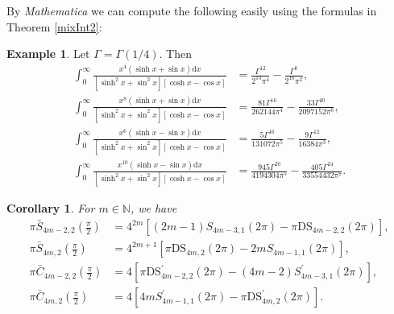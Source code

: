 \documentclass[11pt]{article}
\theoremstyle{plain}
\newtheorem{cor}[thm]{Corollary}
\theoremstyle{definition}
\newtheorem{exa}[thm]{Example}
\begin{document}
By \emph{Mathematica} we can compute the following easily using the formulas in Theorem \ref{mixInt2}:
\begin{exa}\label{ExampleS}
		Let $\Gamma=\Gamma(1/4)$. Then
		\begin{align}
\int_0^{\infty}{\frac{x^4\left( \sinh x+\sin x \right) \mathrm{d}x}{\left[ \sinh ^2x+\sin ^2x \right] \left[ \cosh x-\cos x \right]}}&=\frac{\Gamma ^{12}}{2^{13}\pi ^4}-\frac{\Gamma ^8}{2^{10}\pi ^2},
	\nonumber\\
\int_0^{\infty}{\frac{x^8\left( \sinh x+\sin x \right) \mathrm{d}x}{\left[ \sinh ^2x+\sin ^2x \right] \left[ \cosh x-\cos x \right]}}&=\frac{81\Gamma ^{16}}{262144\pi ^4}-\frac{33\Gamma ^{20}}{2097152\pi ^6},
	\nonumber\\
\int_0^{\infty}{\frac{x^6\left( \sinh x-\sin x \right) \mathrm{d}x}{\left[ \sinh ^2x+\sin ^2x \right] \left[ \cosh x-\cos x \right]}}&=\frac{5\Gamma ^{16}}{131072\pi ^5}-\frac{9\Gamma ^{12}}{16384\pi ^3},
	\nonumber\\
\int_0^{\infty}{\frac{x^{10}\left( \sinh x-\sin x \right) \mathrm{d}x}{\left[ \sinh ^2x+\sin ^2x \right] \left[ \cosh x-\cos x \right]}}&=\frac{945\Gamma ^{20}}{4194304\pi ^5}-\frac{405\Gamma ^{24}}{33554432\pi ^7}.	\nonumber
	\end{align}
\end{exa}
\begin{cor}
	For $m\in \mathbb{N}$, we have
	\begin{align}
				\pi \bar{S}_{4m-2,2}\left( \frac{\pi}{2} \right) &=4^{2m}\left[ \left( 2m-1 \right) S_{4m-3,1}\left( 2\pi \right) -\pi \mathrm{DS}_{4m-2,2}\left( 2\pi \right) \right] ,
		\\
		\pi \bar{S}_{4m,2}\left( \frac{\pi}{2} \right) &=4^{2m+1}\left[ \pi \mathrm{DS}_{4m,2}\left( 2\pi \right) -2mS_{4m-1,1}\left( 2\pi \right) \right] ,
		\\
		\pi \bar{C}_{4m-2,2}\left( \frac{\pi}{2} \right) &=4\left[ \pi \mathrm{DS}_{4m-2,2}^{\prime}\left( 2\pi \right) -\left( 4m-2 \right) S_{4m-3,1}^{\prime}\left( 2\pi \right) \right] ,
		\\
		\pi \bar{C}_{4m,2}\left( \frac{\pi}{2} \right) &=4\left[ 4mS_{4m-1,1}^{\prime}\left( 2\pi \right) -\pi \mathrm{DS}_{4m,2}^{\prime}\left( 2\pi \right) \right] .
	\end{align}
\end{cor}
\end{document}
